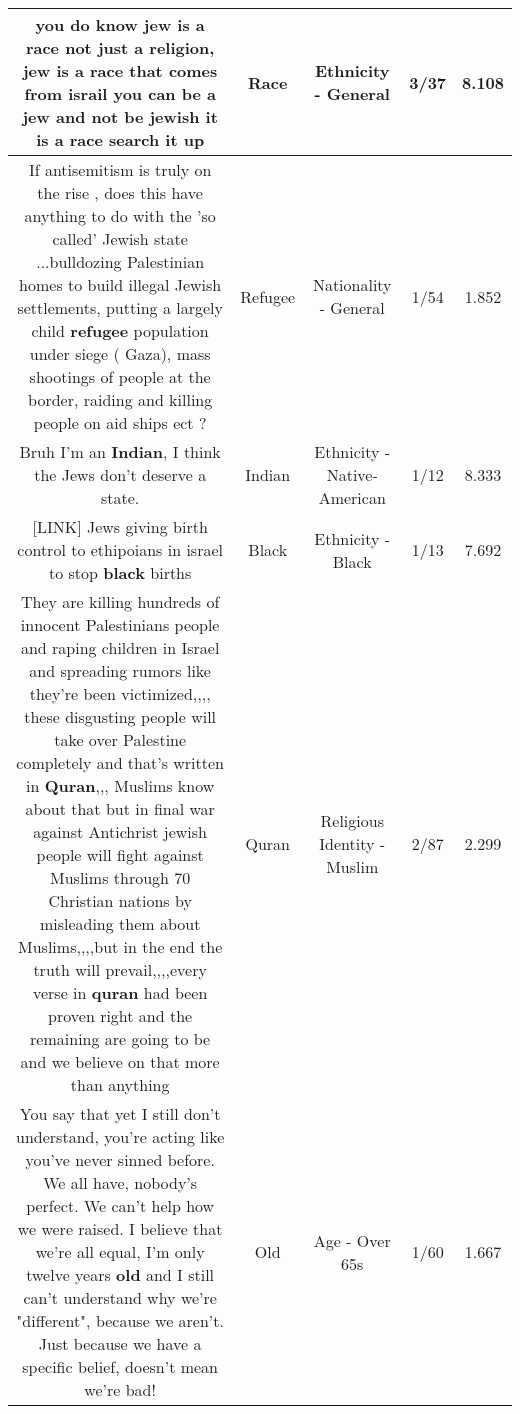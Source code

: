 \documentclass[11pt]{article}
\newlength\mylength
\begin{document}
\begin{center}
\begin{longtable}{|C{.65\mylength}|C{.30\mylength}|C{.12\mylength}|C{.12\mylength}|C{.12\mylength}|}
  \small {} you do know jew is a \textbf{race} not just a religion, jew is a \textbf{race} that comes from israil you can be a jew and not be jewish it is a \textbf{race} search it up\normalsize   & Race & Ethnicity - General & 3/37 & 8.108 \\  \hline
  \small If antisemitism is truly on the rise , does this have anything to do with the 'so called' Jewish state ...bulldozing Palestinian homes to build illegal Jewish settlements, putting a largely child \textbf{refugee} population under siege ( Gaza), mass shootings of people at the border, raiding and killing people on aid ships ect ?\normalsize   & Refugee & Nationality - General & 1/54 & 1.852 \\  \hline
  \small Bruh I'm an \textbf{Indian}, I think the Jews don't deserve a state.\normalsize   & Indian & Ethnicity - Native-American & 1/12 & 8.333 \\  \hline
  \small  [LINK] Jews giving birth control to ethipoians in israel to stop \textbf{black} births\normalsize   & Black & Ethnicity - Black & 1/13 & 7.692 \\  \hline
  \small They are killing hundreds of innocent Palestinians people and raping children in Israel and spreading rumors like they're been victimized,,,, these disgusting people will take over Palestine completely and that's written in \textbf{Quran},,, Muslims know about that but in final war against Antichrist jewish people will fight against Muslims through 70 Christian nations by misleading them about Muslims,,,,but in the end the truth will prevail,,,,every verse in \textbf{quran} had been proven right and the remaining are going to be and we believe on that more than anything\normalsize   & Quran & Religious Identity - Muslim & 2/87 & 2.299 \\  \hline
  \small You say that yet I still don't understand, you're acting like you've never sinned before. We all have, nobody's perfect. We can't help how we were raised. I believe that we're all equal, I'm only twelve years \textbf{old} and I still can't understand why we're "different", because we aren't. Just because we have a specific belief, doesn't mean we're bad!\normalsize   & Old & Age - Over 65s & 1/60 & 1.667 \\  \hline

\end{longtable}
\end{center}
\end{document}
